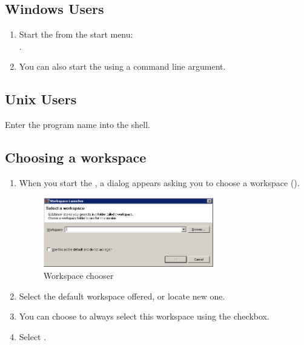 

\subsection{Windows Users}
\begin{enumerate}
\item Start the \ite{}  from the start menu:\\
.

\item You can also start the \ite{} using a command line argument.
\end{enumerate}

\subsection{Unix Users}
Enter the program name into the shell. 

\subsection{Choosing a workspace}
\begin{enumerate}
\item When you start the \ite{}, a dialog appears asking you to choose a workspace ().

\begin{figure}[h]
\begin{center}
\includegraphics[width=0.7\textwidth]{Tasks/Start/PS/workspacechooser}
\caption{Workspace chooser}
\label{WorkspaceChooser}
\end{center}
\end{figure}

\item Select the default workspace offered, or locate new one. 
\item You can choose to always select this workspace using the checkbox.
 \item Select .
 \end{enumerate}

